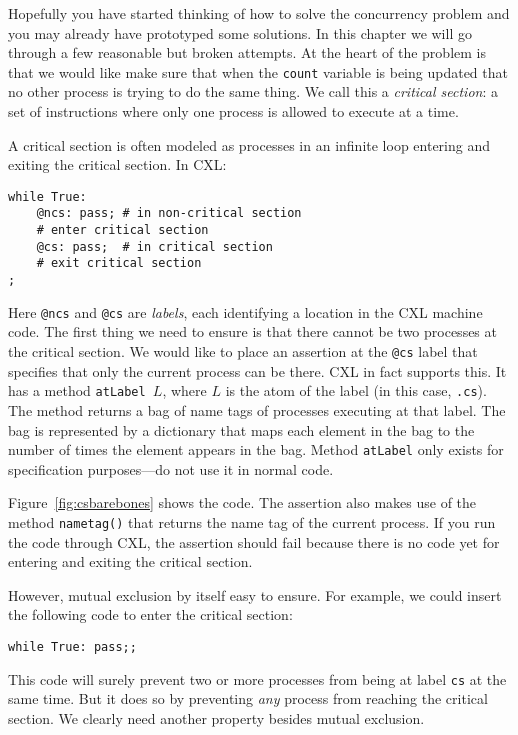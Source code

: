 \documentclass{report}
\newenvironment{code}{
\tcolorbox
}{
\endtcolorbox
}
\begin{document}
Hopefully you have started thinking of how to solve the concurrency
problem and you may already have prototyped some solutions.
In this chapter we will go through a few reasonable but broken attempts.
At the heart of the problem is that we would like make sure that when
the \texttt{count} variable is being updated that no other process is
trying to do the same thing.  We call this a \emph{critical section}: a
set of instructions where only one process is allowed to execute at a
time.

A critical section is often modeled as processes in an infinite loop
entering and exiting the critical section.  In CXL:

\begin{code}
\begin{verbatim}
while True:
    @ncs: pass; # in non-critical section
    # enter critical section
    @cs: pass;  # in critical section
    # exit critical section
;
\end{verbatim}
\end{code}

Here \texttt{@ncs} and \texttt{@cs} are \emph{labels}, each identifying
a location in the CXL machine code.  The first thing we need to
ensure is that there cannot be two processes at the critical section.
We would like to place an assertion at the \texttt{@cs} label that
specifies that only the current process can be there.  CXL in fact
supports this.  It has a method \texttt{atLabel $L$}, where $L$
is the atom of the label (in this case, \texttt{.cs}).  The
method returns a bag of name tags of processes executing at that
label.  The bag is represented by a dictionary that maps each element
in the bag to the number of times the element appears in the bag.
Method \texttt{atLabel} only exists for specification purposes---do not
use it in normal code.

Figure~\ref{fig:csbarebones} shows the code.
The assertion also makes use of the method \texttt{nametag()} that
returns the name tag of the current process.
If you run the code through CXL, the assertion should fail because
there is no code yet for entering and exiting the critical section.

However, mutual exclusion by itself easy to ensure.
For example, we could insert the following code to enter the
critical section:
\begin{code}
\begin{verbatim}
while True: pass;;
\end{verbatim}
\end{code}
This code will surely prevent two or more processes from being
at label \texttt{cs} at the same time.
But it does so by preventing \emph{any} process from reaching
the critical section.
We clearly need another property besides mutual exclusion.
\end{document}

